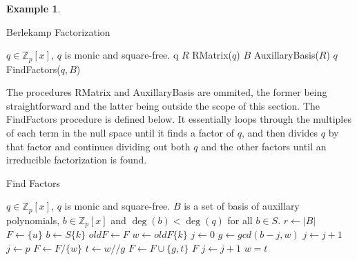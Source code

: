 \documentclass{article}
\theoremstyle{definition}
\newtheorem{exa}[thm]{Example}
\begin{document}
\begin{exa}
    \begin{algorithm}\small
    \caption{Berlekamp Factorization \cite{bf}}
        \begin{algorithmic}[1]
            \Require $q \in \mathbb{Z}_p[x]$, $q$ is monic and square-free.
                \State \Return q
            \EndIf
            \State $R$ \gets RMatrix($q$)
            \State $B$ \gets AuxillaryBasis($R$)
                \State \Return $q$
            \EndIf
            \State \Return FindFactors($q, B$)
        \end{algorithmic}
    \end{algorithm}
    
    The procedures RMatrix and AuxillaryBasis are ommited, the former being straightforward and the latter being outside the scope of this section. The FindFactors procedure is defined below. It essentially loops through the multiples of each term in the null space until it finds a factor of $q$, and then divides $q$ by that factor and continues dividing out both $q$ and the other factors until an irreducible factorization is found.
    
    \begin{algorithm}\small
    \caption{Find Factors}
        \begin{algorithmic}[1]
            \Require $q \in \mathbb{Z}_p[x]$, $q$ is monic and square-free.
            \Require $B$ is a set of basis of auxillary polynomials, $b \in \mathbb{Z}_p[x]$ and $\deg(b) < \deg(q)$ for all $b \in S$.
            \State $r \gets |B|$
            \State $F \gets \{u\}$
               \State $b \gets S\{k\}$
               \State $oldF \gets F$
                    \State $w \gets oldF\{k\}$
                    \State $j \gets 0$
                        \State $g \gets gcd(b-j, w)$
                            \State $j \gets j + 1$
                            \State $j \gets p$
                        \Else
                            \State $F \gets F/\{w\}$
                            \State $t \gets w // g$
                            \State $F \gets F     \cup \{g, t\}$
                                \State \Return $F$
                            \Else
                                \State $j \gets j + 1$
                                \State $w = t$
                            \EndIf
                        \EndIf
                    \EndWhile
                \EndFor
            \EndFor
        \end{algorithmic}
    \end{algorithm}
    
    \end{exa}
    
\end{document}
